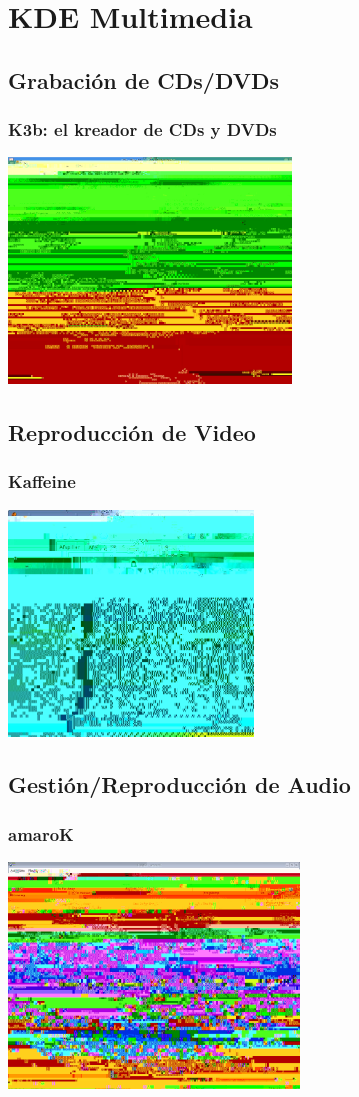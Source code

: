 \section{KDE Multimedia}

\subsection{Grabación de CDs/DVDs}
\frame
{
	\frametitle{K3b: el kreador de CDs y DVDs}
	\begin{center}
		\includegraphics[height=6cm]{./imgs/k3b.jpg}
	\end{center}
}

\subsection{Reproducción de Video}
\frame
{
	\frametitle{Kaffeine}
	\begin{center}
		\includegraphics[height=6cm]{./imgs/kaffeine.jpg}
	\end{center}
}

\subsection{Gestión/Reproducción de Audio}
\frame
{
	\frametitle{amaroK}
	\begin{center}
		\includegraphics[height=6cm]{./imgs/amarok.jpg}
	\end{center}
}

